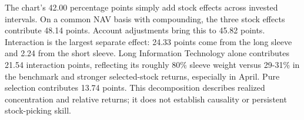 The chart's 42.00 percentage points simply add stock effects across invested
intervals. On a common NAV basis with compounding, the three stock effects
contribute 48.14 points. Account adjustments bring this to 45.82 points.
Interaction is the largest separate effect: 24.33 points come from the long
sleeve and 2.24 from the short sleeve. Long Information Technology alone
contributes 21.54 interaction points, reflecting its roughly 80\% sleeve weight
versus 29-31\% in the benchmark and stronger selected-stock returns, especially
in April. Pure selection contributes 13.74 points. This decomposition describes
realized concentration and relative returns; it does not establish causality
or persistent stock-picking skill.
\FloatBarrier
